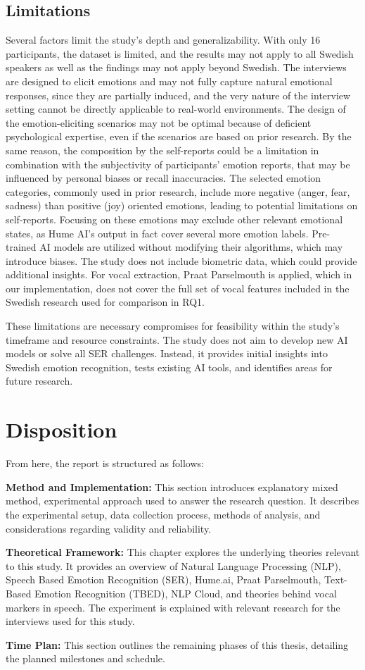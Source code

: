 \subsection{Limitations}
Several factors limit the study’s depth and generalizability. With only 16 participants, the dataset is limited, and the results may not apply to all Swedish speakers as well as the findings may not apply beyond Swedish. The interviews are designed to elicit emotions and may not fully capture natural emotional responses, since they are partially induced, and the very nature of the interview setting cannot be directly applicable to real-world environments. The design of the emotion-eliciting scenarios may not be optimal because of deficient psychological expertise, even if the scenarios are based on prior research. By the same reason, the composition by the self-reports could be a limitation in combination with the subjectivity of participants’ emotion reports, that may be influenced by personal biases or recall inaccuracies. The selected emotion categories, commonly used in prior research, include more negative (anger, fear, sadness) than positive (joy) oriented emotions, leading to potential limitations on self-reports. Focusing on these emotions may exclude other relevant emotional states, as Hume AI’s output in fact cover several more emotion labels. Pre-trained AI models are utilized without modifying their algorithms, which may introduce biases. The study does not include biometric data, which could provide additional insights. For vocal extraction, Praat Parselmouth is applied, which in our implementation, does not cover the full set of vocal features included in the Swedish research \autocite{Ekberg2023} used for comparison in RQ1. 

These limitations are necessary compromises for feasibility within the study’s timeframe and resource constraints. The study does not aim to develop new AI models or solve all SER challenges. Instead, it provides initial insights into Swedish emotion recognition, tests existing AI tools, and identifies areas for future research. 

\section{Disposition}
From here, the report is structured as follows: 

\textbf{Method and Implementation:} This section introduces explanatory mixed method, experimental approach used to answer the research question. It describes the experimental setup, data collection process, methods of analysis, and considerations regarding validity and reliability.   

\textbf{Theoretical Framework:} This chapter explores the underlying theories relevant to this study. It provides an overview of Natural Language Processing (NLP), Speech Based Emotion Recognition (SER), Hume.ai, Praat Parselmouth, Text-Based Emotion Recognition (TBED), NLP Cloud, and theories behind vocal markers in speech. The experiment is explained with relevant research for the interviews used for this study. 

\textbf{Time Plan:} This section outlines the remaining phases of this thesis, detailing the planned milestones and schedule. 
